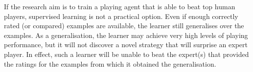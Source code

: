 If the research aim is to train a playing agent that is able to beat top human players, supervised learning is not a practical option.  Even if enough correctly rated (or compared) examples are available, the learner still generalises over the examples. As a generalisation, the learner may achieve very high levels of playing performance, but it will not discover a novel strategy that will surprise an expert player.  In effect, such a learner will be unable to beat the expert(s) that provided the ratings for the examples from which it obtained the generalisation.     
%
%
%
